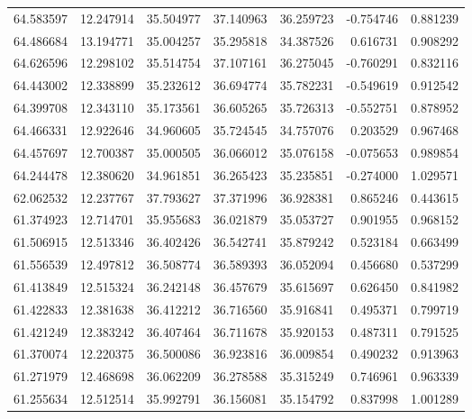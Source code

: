 \begin{tabular}{rrrrrrr}
 64.583597 &  12.247914 &         35.504977 &         37.140963 &         36.259723 & -0.754746 &  0.881239 \\
 64.486684 &  13.194771 &         35.004257 &         35.295818 &         34.387526 &  0.616731 &  0.908292 \\
 64.626596 &  12.298102 &         35.514754 &         37.107161 &         36.275045 & -0.760291 &  0.832116 \\
 64.443002 &  12.338899 &         35.232612 &         36.694774 &         35.782231 & -0.549619 &  0.912542 \\
 64.399708 &  12.343110 &         35.173561 &         36.605265 &         35.726313 & -0.552751 &  0.878952 \\
 64.466331 &  12.922646 &         34.960605 &         35.724545 &         34.757076 &  0.203529 &  0.967468 \\
 64.457697 &  12.700387 &         35.000505 &         36.066012 &         35.076158 & -0.075653 &  0.989854 \\
 64.244478 &  12.380620 &         34.961851 &         36.265423 &         35.235851 & -0.274000 &  1.029571 \\
 62.062532 &  12.237767 &         37.793627 &         37.371996 &         36.928381 &  0.865246 &  0.443615 \\
 61.374923 &  12.714701 &         35.955683 &         36.021879 &         35.053727 &  0.901955 &  0.968152 \\
 61.506915 &  12.513346 &         36.402426 &         36.542741 &         35.879242 &  0.523184 &  0.663499 \\
 61.556539 &  12.497812 &         36.508774 &         36.589393 &         36.052094 &  0.456680 &  0.537299 \\
 61.413849 &  12.515324 &         36.242148 &         36.457679 &         35.615697 &  0.626450 &  0.841982 \\
 61.422833 &  12.381638 &         36.412212 &         36.716560 &         35.916841 &  0.495371 &  0.799719 \\
 61.421249 &  12.383242 &         36.407464 &         36.711678 &         35.920153 &  0.487311 &  0.791525 \\
 61.370074 &  12.220375 &         36.500086 &         36.923816 &         36.009854 &  0.490232 &  0.913963 \\
 61.271979 &  12.468698 &         36.062209 &         36.278588 &         35.315249 &  0.746961 &  0.963339 \\
 61.255634 &  12.512514 &         35.992791 &         36.156081 &         35.154792 &  0.837998 &  1.001289 \\

\end{tabular}
